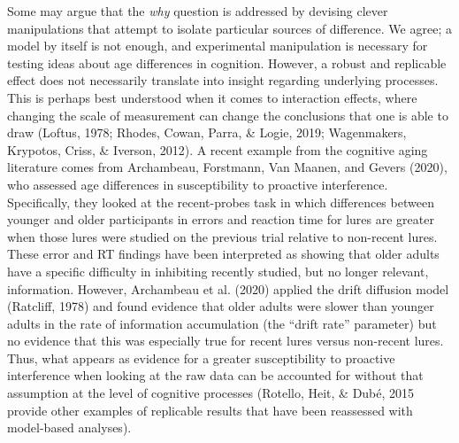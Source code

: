\documentclass[
  english,
  ,man,floatsintext]{apa6}
\begin{document}
Some may argue that the \emph{why} question is addressed by devising clever manipulations that attempt to isolate particular sources of difference. We agree; a model by itself is not enough, and experimental manipulation is necessary for testing ideas about age differences in cognition. However, a robust and replicable effect does not necessarily translate into insight regarding underlying processes. This is perhaps best understood when it comes to interaction effects, where changing the scale of measurement can change the conclusions that one is able to draw (Loftus, 1978; Rhodes, Cowan, Parra, \& Logie, 2019; Wagenmakers, Krypotos, Criss, \& Iverson, 2012). A recent example from the cognitive aging literature comes from Archambeau, Forstmann, Van Maanen, and Gevers (2020), who assessed age differences in susceptibility to proactive interference. Specifically, they looked at the recent-probes task in which differences between younger and older participants in errors and reaction time for lures are greater when those lures were studied on the previous trial relative to non-recent lures. These error and RT findings have been interpreted as showing that older adults have a specific difficulty in inhibiting recently studied, but no longer relevant, information. However, Archambeau et al. (2020) applied the drift diffusion model (Ratcliff, 1978) and found evidence that older adults were slower than younger adults in the rate of information accumulation (the \enquote{drift rate} parameter) but no evidence that this was especially true for recent lures versus non-recent lures. Thus, what appears as evidence for a greater susceptibility to proactive interference when looking at the raw data can be accounted for without that assumption at the level of cognitive processes (Rotello, Heit, \& Dubé, 2015 provide other examples of replicable results that have been reassessed with model-based analyses).
\end{document}

